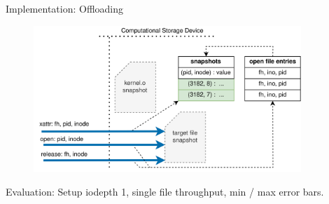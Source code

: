 \documentclass{beamer}
\begin{document}
\begin{frame}{Implementation: Offloading}
	\begingroup
	\small 
	\begin{figure}
		\centering
		\includegraphics[width=0.9\textwidth]{resources/images/offloading-management.png}
	\end{figure}
	\endgroup
\end{frame}

\begin{frame}{Evaluation: Setup}
	\begingroup
	\tiny iodepth 1, single file throughput, min / max error bars.
	
	\endgroup
\end{frame}
\end{document}
